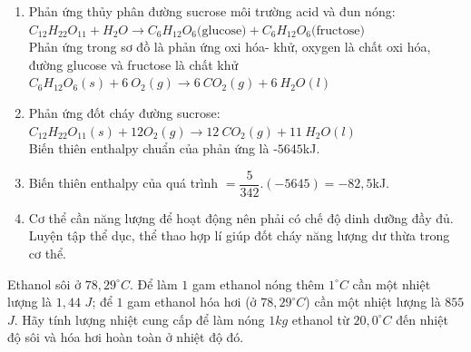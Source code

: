 \documentclass[Main.tex]{subfiles}
\begin{document}
\begin{bt}
{\begin{enumerate}
				\item [(b)] Phản ứng thủy phân đường sucrose môi trường acid và đun nóng:
				\\
				$C_{12}H_{22}O_{11} + H_2O \rightarrow C_6H_{12}O_6 \text{(glucose)} + C_6H_{12}O_6 \text{(fructose)}$
				\\
				Phản ứng trong sơ đồ là phản ứng oxi hóa- khử, oxygen là chất oxi hóa, đường glucose và fructose là chất khử $C_6H_{12}O_6(s) + 6 \ O_2(g) \rightarrow 6 \ CO_2(g) + 6 \ H_2O(l)$
				\item [(c)] Phản ứng đốt cháy đường sucrose: $C_{12}H_{22}O_{11}(s) + 12O_2(g) \rightarrow 12 \ CO_2(g) + 11 \ H_2O(l)$
				\\
				Biến thiên enthalpy chuẩn của phản ứng là -$5645$kJ.
				\item [(d)] Biến thiên enthalpy của quá trình $= \dfrac{5}{342}.(-5645) = -82{,}5$kJ.
				\item [(e)] Cơ thể cần năng lượng để hoạt động nên phải có chế độ dinh dưỡng đầy đủ. Luyện tập thể dục, thể thao hợp lí giúp đốt cháy năng lượng dư thừa trong cơ thể.
			\end{enumerate}
		}
	\end{bt}
	\begin{bt}[][CD – SBT] Ethanol sôi ở $78{,}29^\circ C$. Để làm $1$ gam ethanol nóng thêm $1^\circ C$ cần một nhiệt lượng là $1{,}44$ $J$; để $1$ gam ethanol hóa hơi (ở $78{,}29^\circ C$) cần một nhiệt lượng là $855$ $J$. Hãy tính lượng nhiệt cung cấp để làm nóng $1kg$ ethanol từ $20{,}0^\circ C$ đến nhiệt độ sôi và hóa hơi hoàn toàn ở nhiệt độ đó.
	\end{bt}
\end{document}
